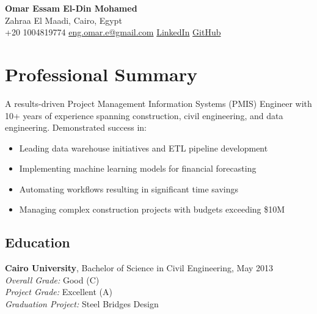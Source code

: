 \documentclass[10pt, letterpaper]{article}
\begin{document}
\begin{mdframed}[style=cvframe]
\begin{center}
    {\LARGE \textbf{Omar Essam El-Din Mohamed}} \\[0.3em]
    {Zahraa El Maadi, Cairo, Egypt} \\[0.2em]
    {\faPhone* \hspace{0.2cm} +20 1004819774} \hspace{0.7cm}
    {\href{mailto:eng.omar.e@gmail.com}{\faEnvelope[regular] \hspace{0.2cm} eng.omar.e@gmail.com}} \hspace{0.7cm}
    {\href{https://www.linkedin.com/in/omar-essam-b602279b}{\faLinkedin \hspace{0.2cm} LinkedIn}} \hspace{0.7cm}
    {\href{https://github.com/omare32}{\faGithub \hspace{0.2cm} GitHub}}
\end{center}

\section{Professional Summary}
A results-driven Project Management Information Systems (PMIS) Engineer with 10+ years of experience spanning construction, civil engineering, and data engineering. Demonstrated success in:
\begin{itemize}[leftmargin=*]
    \item Leading data warehouse initiatives and ETL pipeline development
    \item Implementing machine learning models for financial forecasting
    \item Automating workflows resulting in significant time savings
    \item Managing complex construction projects with budgets exceeding \$10M
\end{itemize}

\begin{multicols}{2}
\section{Education}
\textbf{Cairo University}, Bachelor of Science in Civil Engineering, May 2013 \\
\textit{Overall Grade:} Good (C) \\
\textit{Project Grade:} Excellent (A) \\
\textit{Graduation Project:} Steel Bridges Design


\end{multicols}
\end{mdframed}
\end{document}

